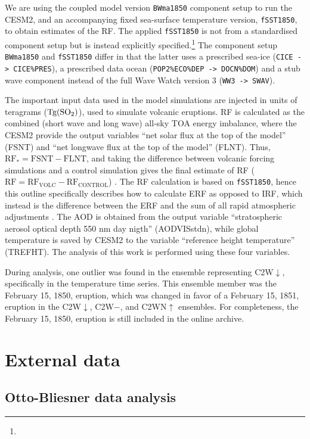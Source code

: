\documentclass[draft]{agujournal2019}
\newcommand{\iso}[1][i]{{#1}njected \ce{SO2}}
\newcommand{\cwm}{C2W\(\downarrow\)}
\newcommand{\cwmp}{C2W\(-\)}
\newcommand{\cws}{C2WN\(\uparrow\)}
\begin{document}
We are using the coupled model version \texttt{BWma1850} component setup to run the
CESM2, and an accompanying fixed sea-surface temperature version, \texttt{fSST1850}, to
obtain estimates of the RF. The applied \texttt{fSST1850} is not from a standardised
component setup but is instead explicitly specified.\footnote{\fssturl} The component
setup \texttt{BWma1850} and \texttt{fSST1850} differ in that the latter uses a
prescribed sea-ice (\texttt{CICE -> CICE\%PRES}), a prescribed data ocean
(\texttt{POP2\%ECO\%DEP -> DOCN\%DOM}) and a stub wave component instead of the full
Wave Watch version 3 (\texttt{WW3 -> SWAV}).

The important input data used in the model simulations are \iso{} in units of teragrams
(\(\si{\tera\gram(\ce{SO2})}\)), used to simulate volcanic eruptions. RF is calculated
as the combined (short wave and long wave) all-sky TOA energy imbalance, where the CESM2
provide the output variables ``net solar flux at the top of the model'' (FSNT) and ``net
longwave flux at the top of the model'' (FLNT). Thus, \(\mathrm{RF_*}= \mathrm{FSNT} -
\mathrm{FLNT}\), and taking the difference between volcanic forcing simulations and a
control simulation gives the final estimate of RF
(\(\mathrm{RF}=\mathrm{RF_{VOLC}}-\mathrm{RF_{CONTROL}}\)) \cite{marshall2020}. The RF
calculation is based on \texttt{fSST1850}, hence this outline specifically describes how
to calculate ERF as opposed to IRF, which instead is the difference between the ERF and
the sum of all rapid atmospheric adjustments \cite{marshall2020,smith2018}. The AOD is
obtained from the output variable ``stratospheric aerosol optical depth 550 nm day
nigth'' (AODVISstdn), while global temperature is saved by CESM2 to the variable
``reference height temperature'' (TREFHT). The analysis of this work is performed using
these four variables.

During analysis, one outlier was found in the ensemble representing \cwm{}, specifically
in the temperature time series. This ensemble member was the February 15, 1850,
eruption, which was changed in favor of a February 15, 1851, eruption in the \cwm{},
\cwmp{}, and \cws{} ensembles. For completeness, the February 15, 1850, eruption is
still included in the online archive.

\section{External data}

\subsection{Otto-Bliesner data analysis}\label{ap:ob16}
\end{document}

